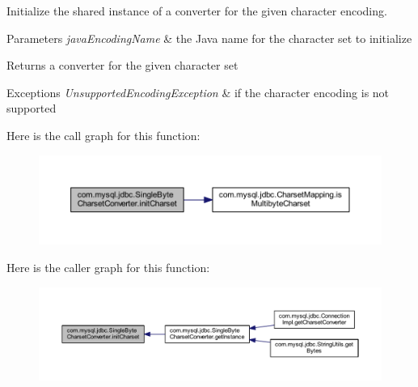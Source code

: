Initialize the shared instance of a converter for the given character encoding.


\begin{DoxyParams}{Parameters}
{\em java\+Encoding\+Name} & the Java name for the character set to initialize \\
\hline
\end{DoxyParams}
\begin{DoxyReturn}{Returns}
a converter for the given character set 
\end{DoxyReturn}

\begin{DoxyExceptions}{Exceptions}
{\em Unsupported\+Encoding\+Exception} & if the character encoding is not supported \\
\hline
\end{DoxyExceptions}
Here is the call graph for this function\+:
\nopagebreak
\begin{figure}[H]
\begin{center}
\leavevmode
\includegraphics[width=350pt]{classcom_1_1mysql_1_1jdbc_1_1_single_byte_charset_converter_a756d8433aca86ef6942c0eb1a106a898_cgraph}
\end{center}
\end{figure}
Here is the caller graph for this function\+:
\nopagebreak
\begin{figure}[H]
\begin{center}
\leavevmode
\includegraphics[width=350pt]{classcom_1_1mysql_1_1jdbc_1_1_single_byte_charset_converter_a756d8433aca86ef6942c0eb1a106a898_icgraph}
\end{center}
\end{figure}
\mbox{\label{classcom_1_1mysql_1_1jdbc_1_1_single_byte_charset_converter_a88dcfd9fecdfa02f7f61be8f24f5d973}} 
